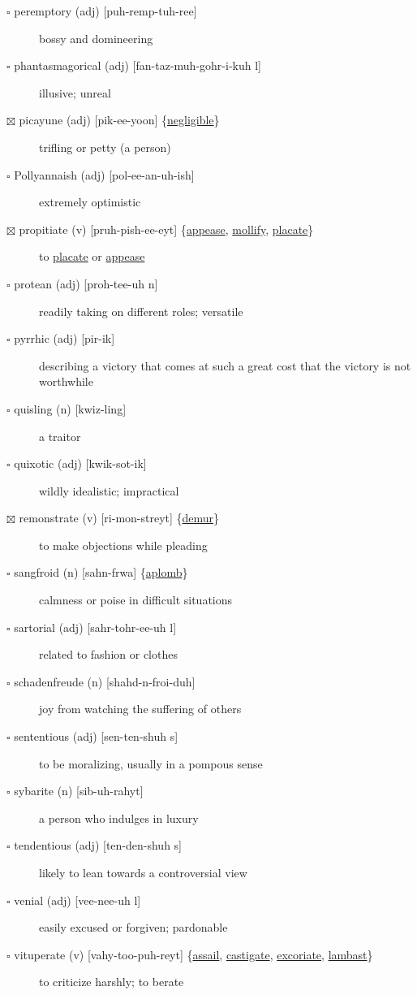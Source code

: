 \documentclass[11pt]{article}
\begin{document}
\begin{description}
\item[{$\square$ peremptory (adj) [puh-remp-tuh-ree]}] bossy and domineering
\item[{$\square$ phantasmagorical (adj) [fan-taz-muh-gohr-i-kuh l]}] illusive; unreal
\item[{$\boxtimes$ \label{orgd3602cc}picayune (adj) [pik-ee-yoon] \{\hyperref[org77d49ae]{negligible}\}}] trifling or petty (a person)
\item[{$\square$ Pollyannaish (adj) [pol-ee-an-uh-ish]}] extremely optimistic
\item[{$\boxtimes$ \label{org1023dff}propitiate (v) [pruh-pish-ee-eyt] \{\hyperref[orgd8f6dca]{appease}, \hyperref[org3a878a4]{mollify}, \hyperref[orgdd5cad8]{placate}\}}] to \hyperref[orgdd5cad8]{placate} or \hyperref[orgd8f6dca]{appease}
\item[{$\square$ protean (adj) [proh-tee-uh n]}] readily taking on different roles; versatile
\item[{$\square$ pyrrhic (adj) [pir-ik]}] describing a victory that comes at such a great cost that the victory is not worthwhile
\item[{$\square$ quisling (n) [kwiz-ling]}] a traitor
\item[{$\square$ quixotic (adj) [kwik-sot-ik]}] wildly idealistic; impractical
\item[{$\boxtimes$ \label{orge262f48}remonstrate (v) [ri-mon-streyt] \{\hyperref[org09f4137]{demur}\}}] to make objections while pleading
\item[{$\square$ \label{org07d57b7}sangfroid (n) [sahn-frwa] \{\hyperref[orga1f4044]{aplomb}\}}] calmness or poise in difficult situations
\item[{$\square$ sartorial (adj) [sahr-tohr-ee-uh l]}] related to fashion or clothes
\item[{$\square$ schadenfreude (n) [shahd-n-froi-duh]}] joy from watching the suffering of others
\item[{$\square$ \label{org6234d3c}sententious (adj) [sen-ten-shuh s]}] to be moralizing, usually in a pompous sense
\item[{$\square$ sybarite (n) [sib-uh-rahyt]}] a person who indulges in luxury
\item[{$\square$ tendentious (adj) [ten-den-shuh s]}] likely to lean towards a controversial view
\item[{$\square$ venial (adj) [vee-nee-uh l]}] easily excused or forgiven; pardonable
\item[{$\square$ \label{org5485467} \label{orgad849f5}vituperate (v) [vahy-too-puh-reyt] \{\hyperref[orgb5ea66c]{assail}, \hyperref[org41ed9c5]{castigate}, \hyperref[org58b0cbc]{excoriate}, \hyperref[orgcb82180]{lambast}\}}] to criticize harshly; to berate
\end{description}
\end{document}
